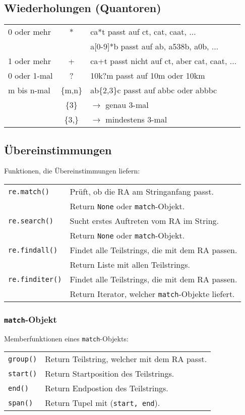 \subsection{Wiederholungen (Quantoren)}
\begin{tabular}{lcl}
	0 oder mehr     & * 		& ca*t passt auf ct, cat, caat, ...\\
					&			& a[0-9]*b passt auf ab, a538b, a0b, ...\\
	1 oder mehr	    & + 		& ca+t passt nicht auf ct, aber cat, caat, ...\\
	0 oder 1-mal	& ? 		& 10k?m passt auf 10m oder 10km\\
	m bis n-mal		& \{m,n\}	& ab\{2,3\}c passt auf abbc oder abbbc\\
					& \{3\}		& $\rightarrow$ genau 3-mal\\
					& \{3,\}	& $\rightarrow$ mindestens 3-mal\\
\end{tabular}


\subsection{Übereinstimmungen}
Funktionen, die Übereinstimmungen liefern:\\
\begin{tabular}{ll}
	\texttt{re.match()}& Prüft, ob die RA am Stringanfang passt.\\
	& Return \texttt{None} oder \texttt{match}-Objekt.\\
	\texttt{re.search()}& Sucht erstes Auftreten vom RA im String.\\
	& Return \texttt{None} oder \texttt{match}-Objekt.\\
	\texttt{re.findall()}& Findet alle Teilstrings, die mit dem RA passen.\\
	& Return Liste mit allen Teilstrings.\\
	\texttt{re.finditer()}& Findet alle Teilstrings, die mit dem RA passen.\\
	& Return Iterator, welcher \texttt{match}-Objekte liefert.\\
\end{tabular}

	
\subsubsection{\texttt{match}-Objekt}
Memberfunktionen eines \texttt{match}-Objekts:\\
\begin{tabular}{ll}
	\texttt{group()}& Return Teilstring, welcher mit dem RA passt.\\
	\texttt{start()}& Return Startposition des Teilstrings.\\
	\texttt{end()}& Return Endpostion des Teilstrings.\\
	\texttt{span()}& Return Tupel mit (\texttt{start, end}).
\end{tabular}

